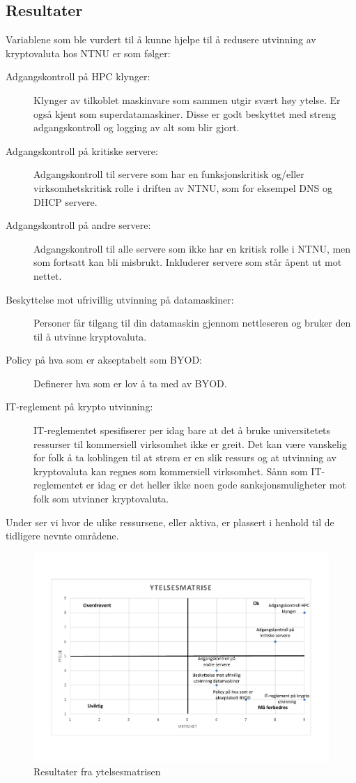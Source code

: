 \subsection{Resultater}
Variablene som ble vurdert til å kunne hjelpe til å redusere utvinning av kryptovaluta hos NTNU er som følger:
\begin{description}
    \item[Adgangskontroll på HPC klynger:] Klynger av tilkoblet maskinvare som sammen utgir svært høy ytelse. Er også kjent som superdatamaskiner. Disse er godt beskyttet med streng adgangskontroll og logging av alt som blir gjort.
    \item[Adgangskontroll på kritiske servere:] Adgangskontroll til servere som har en funksjonskritisk og/eller virksomhetskritisk rolle i driften av NTNU, som for eksempel DNS og DHCP servere. 
    \item[Adgangskontroll på andre servere:] Adgangskontroll til alle servere som ikke har en kritisk rolle i NTNU, men som fortsatt kan bli misbrukt. Inkluderer servere som står åpent ut mot nettet. 
    \item[Beskyttelse mot ufrivillig utvinning på datamaskiner:] Personer får tilgang til din datamaskin gjennom nettleseren og bruker den til å utvinne kryptovaluta. 
    \item[Policy på hva som er akseptabelt som BYOD:] Definerer hva som er lov å ta med av BYOD.
    \item[IT-reglement på krypto utvinning:] IT-reglementet spesifiserer per idag bare at det å bruke universitetets ressurser til kommersiell virksomhet ikke er greit. Det kan være vanskelig for folk å ta koblingen til at strøm er en slik ressurs og at utvinning av kryptovaluta kan regnes som kommersiell virksomhet. Sånn som IT-reglementet er idag er det heller ikke noen gode sanksjonsmuligheter mot folk som utvinner kryptovaluta.

\end{description}

Under ser vi hvor de ulike ressursene, eller aktiva, er plassert i henhold til de tidligere nevnte områdene.
\begin{figure}[H]
    \centering
    \includegraphics[scale=0.5]{case_3/bilder/ytelsesmatrise.pdf}
    \caption[Ytelsesmatrise]{Resultater fra ytelsesmatrisen}
    \label{fig:ytelsesmatrise}
\end{figure}


